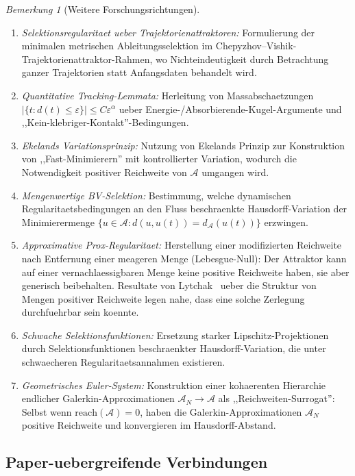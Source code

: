 \documentclass[12pt,a4paper]{article}
\theoremstyle{definition}
\theoremstyle{plain}
\theoremstyle{remark}
\newtheorem{remark}[definition]{Bemerkung}
\begin{document}
\begin{remark}[Weitere Forschungsrichtungen]
\label{rem:further-ns-logdist}
\begin{enumerate}
\item \emph{Selektionsregularitaet ueber Trajektorienattraktoren:} Formulierung der minimalen metrischen Ableitungsselektion im Chepyzhov--Vishik-Trajektorienattraktor-Rahmen, wo Nichteindeutigkeit durch Betrachtung ganzer Trajektorien statt Anfangsdaten behandelt wird.
\item \emph{Quantitative Tracking-Lemmata:} Herleitung von Massabschaetzungen $|\{t : d(t) \leq \varepsilon\}| \leq C \varepsilon^\alpha$ ueber Energie-/Absorbierende-Kugel-Argumente und ,,Kein-klebriger-Kontakt''-Bedingungen.
\item \emph{Ekelands Variationsprinzip:} Nutzung von Ekelands Prinzip zur Konstruktion von ,,Fast-Minimierern'' mit kontrollierter Variation, wodurch die Notwendigkeit positiver Reichweite von $\mathcal{A}$ umgangen wird.
\item \emph{Mengenwertige BV-Selektion:} Bestimmung, welche dynamischen Regularitaetsbedingungen an den Fluss beschraenkte Hausdorff-Variation der Minimierermenge $\{u \in \mathcal{A} : d(u, u(t)) = d_{\mathcal{A}}(u(t))\}$ erzwingen.
\item \emph{Approximative Prox-Regularitaet:} Herstellung einer modifizierten Reichweite nach Entfernung einer meageren Menge (Lebesgue-Null): Der Attraktor kann auf einer vernachlaessigbaren Menge keine positive Reichweite haben, sie aber generisch beibehalten. Resultate von Lytchak~\cite{Lytchak2024} ueber die Struktur von Mengen positiver Reichweite legen nahe, dass eine solche Zerlegung durchfuehrbar sein koennte.
\item \emph{Schwache Selektionsfunktionen:} Ersetzung starker Lipschitz-Projektionen durch Selektionsfunktionen beschraenkter Hausdorff-Variation, die unter schwaecheren Regularitaetsannahmen existieren.
\item \emph{Geometrisches Euler-System:} Konstruktion einer kohaerenten Hierarchie endlicher Galerkin-Approximationen $\mathcal{A}_N \to \mathcal{A}$ als ,,Reichweiten-Surrogat'': Selbst wenn $\mathrm{reach}(\mathcal{A}) = 0$, haben die Galerkin-Approximationen $\mathcal{A}_N$ positive Reichweite und konvergieren im Hausdorff-Abstand.
\end{enumerate}
\end{remark}

\subsection{Paper-uebergreifende Verbindungen}
\end{document}
